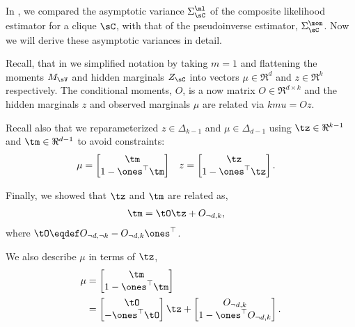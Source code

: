 \subsection{}
\label{app:pw-proof}

In , we compared the asymptotic variance
  $\Sigma^\ml_\sC$ of the composite likelihood estimator for a clique
  $\sC$, with that of the pseudoinverse estimator, $\Sigma^\mom_\sC$. 
  Now we will derive these asymptotic variances in detail.

Recall, that in  we simplified notation by taking
  $m=1$ and flattening the moments $M_\sV$ and hidden marginals $Z_\sC$
  into vectors $\mu \in \Re^d$ and $z \in \Re^k$ respectively. The
  conditional moments, $O$, is a now matrix $O \in \Re^{d\times k}$ and
  the hidden marginals $z$ and observed marginals $\mu$ are related via
  $kmu = O z$.

Recall also that we reparameterized $z \in \Delta_{k-1}$ and $\mu \in
  \Delta_{d-1}$ using $\tz \in \Re^{k-1}$ and $\tm \in \Re^{d-1}$ to avoid
  constraints:
\begin{align*}
  \mu &= 
    \begin{bmatrix}
      \tm \\
      1 - \ones^\top\tm
    \end{bmatrix} 
  &
  z &= 
    \begin{bmatrix}
      \tz \\
      1 - \ones^\top\tz
    \end{bmatrix}.
\end{align*}

Finally, we showed that $\tz$ and $\tm$ are related as,
\begin{align*}
  \tm &= \tO \tz +  O_{\neg d,k},
\end{align*}
where $\tO \eqdef O_{\neg d,\neg k} - O_{\neg d, k} \ones^\top$.

We also describe $\mu$ in terms of $\tz$,
\begin{align*}
  \mu 
  &= 
    \begin{bmatrix}
      \tm \\
      1 - \ones^\top\tm
    \end{bmatrix} \\
    &=
    \begin{bmatrix}
      \tO \\
      - \ones^\top\tO
    \end{bmatrix} \tz 
    + 
    \begin{bmatrix}
      O_{\neg d, k} \\
      1 - \ones^\top O_{\neg d, k}
    \end{bmatrix}.
\end{align*}

